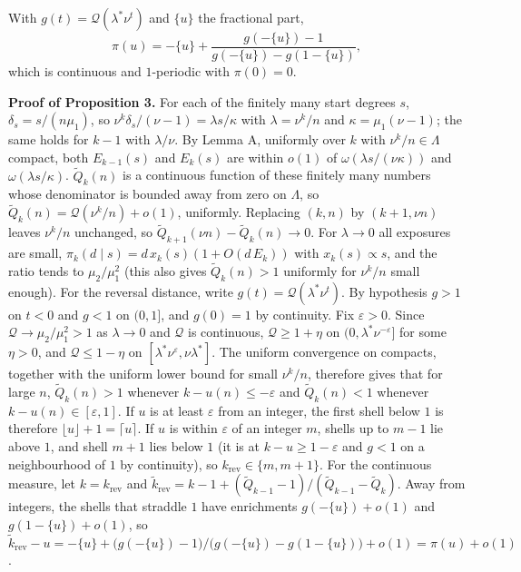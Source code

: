 \documentclass{nws}
\begin{document}
With $g(t)=\mathcal Q(\lambda^*\nu^t)$ and $\{u\}$ the fractional part,
\begin{equation*}
\pi(u)=-\{u\}+\frac{g(-\{u\})-1}{g(-\{u\})-g(1-\{u\})},
\end{equation*}
which is continuous and $1$-periodic with $\pi(0)=0$.

\textbf{Proof of Proposition 3.} For each of the finitely many start degrees $s$,
$\delta_s=s/(n\mu_1)$, so $\nu^k\delta_s/(\nu-1)=\lambda s/\kappa$ with
$\lambda=\nu^k/n$ and $\kappa=\mu_1(\nu-1)$; the same holds for $k-1$ with
$\lambda/\nu$. By Lemma A, uniformly over $k$ with $\nu^k/n\in\Lambda$ compact, both
$E_{k-1}(s)$ and $E_k(s)$ are within $o(1)$ of $\omega(\lambda s/(\nu\kappa))$ and
$\omega(\lambda s/\kappa)$. $\tilde Q_k(n)$ is a continuous function of these
finitely many numbers whose denominator is bounded away from zero on $\Lambda$, so
$\tilde Q_k(n)=\mathcal Q(\nu^k/n)+o(1)$, uniformly. Replacing $(k,n)$ by
$(k+1,\nu n)$ leaves $\nu^k/n$ unchanged, so $\tilde Q_{k+1}(\nu n)-\tilde Q_k(n)\to0$.
For $\lambda\to0$ all exposures are small, $\pi_k(d\mid s)=d\,x_k(s)(1+O(d\,E_k))$ with
$x_k(s)\propto s$, and the ratio tends to $\mu_2/\mu_1^2$ (this also gives
$\tilde Q_k(n)>1$ uniformly for $\nu^k/n$ small enough). For the reversal distance, write $g(t)=\mathcal Q(\lambda^*\nu^t)$.
By hypothesis $g>1$ on $t<0$ and $g<1$ on $(0,1]$, and $g(0)=1$ by continuity. Fix $\varepsilon>0$.
Since $\mathcal Q\to\mu_2/\mu_1^2>1$ as $\lambda\to0$ and $\mathcal Q$ is continuous, $\mathcal Q\ge1+\eta$ on
$(0,\lambda^*\nu^{-\varepsilon}]$ for some $\eta>0$, and $\mathcal Q\le1-\eta$ on $[\lambda^*\nu^{\varepsilon},\nu\lambda^*]$.
The uniform convergence on compacts, together with the uniform lower bound for small $\nu^k/n$, therefore gives
that for large $n$, $\tilde Q_k(n)>1$ whenever $k-u(n)\le-\varepsilon$ and $\tilde Q_k(n)<1$ whenever
$k-u(n)\in[\varepsilon,1]$. If $u$ is at least $\varepsilon$ from an integer, the first shell below $1$ is therefore
$\lfloor u\rfloor+1=\lceil u\rceil$. If $u$ is within $\varepsilon$ of an integer $m$, shells up to $m-1$ lie above $1$,
and shell $m+1$ lies below $1$ (it is at $k-u\ge1-\varepsilon$ and $g<1$ on a neighbourhood of $1$ by continuity),
so $k_{\mathrm{rev}}\in\{m,m+1\}$. For the continuous measure, let $k=k_{\mathrm{rev}}$ and
$\tilde k_{\mathrm{rev}}=k-1+(\tilde Q_{k-1}-1)/(\tilde Q_{k-1}-\tilde Q_k)$. Away from integers, the shells that
straddle $1$ have enrichments $g(-\{u\})+o(1)$ and $g(1-\{u\})+o(1)$, so
$\tilde k_{\mathrm{rev}}-u=-\{u\}+\bigl(g(-\{u\})-1\bigr)/\bigl(g(-\{u\})-g(1-\{u\})\bigr)+o(1)=\pi(u)+o(1)$.
\end{document}
